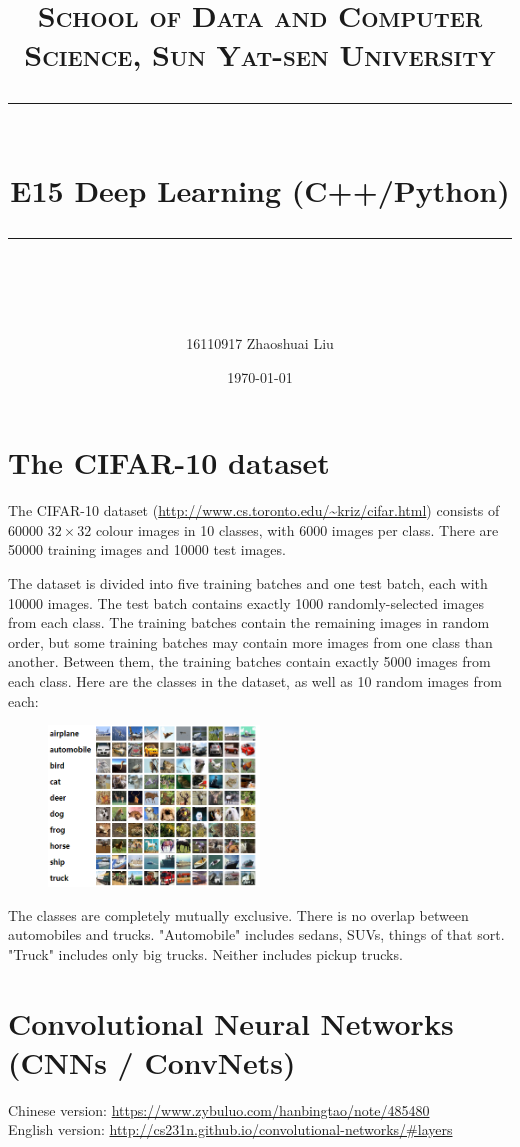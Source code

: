 ﻿\documentclass[a4paper, 11pt]{article}
\title{	
\normalfont \normalsize
\textsc{School of Data and Computer Science, Sun Yat-sen University} \\ [25pt] %
\rule{\textwidth}{0.5pt} \\[0.4cm] %
\huge  E15 Deep Learning (C++/Python)\\ %
\rule{\textwidth}{2pt} \\[0.5cm] %
\author{16110917 Zhaoshuai Liu}
\date{\normalsize\today}
}
\begin{document}
\maketitle
\tableofcontents
\newpage
\section{The CIFAR-10 dataset}
The CIFAR-10 dataset (\url{http://www.cs.toronto.edu/~kriz/cifar.html}) consists of 60000 $32\times 32$ colour images in 10 classes, with 6000 images per class. There are 50000 training images and 10000 test images. 

The dataset is divided into five training batches and one test batch, each with 10000 images. The test batch contains exactly 1000 randomly-selected images from each class. The training batches contain the remaining images in random order, but some training batches may contain more images from one class than another. Between them, the training batches contain exactly 5000 images from each class. Here are the classes in the dataset, as well as 10 random images from each:
\begin{figure}[ht]
\centering
\includegraphics[width=0.5\textwidth]{Pic/cifar}
\end{figure}

The classes are completely mutually exclusive. There is no overlap between automobiles and trucks. "Automobile" includes sedans, SUVs, things of that sort. "Truck" includes only big trucks. Neither includes pickup trucks.
\section{Convolutional Neural Networks (CNNs / ConvNets)}
Chinese version: \url{https://www.zybuluo.com/hanbingtao/note/485480}\\
English version: \url{http://cs231n.github.io/convolutional-networks/#layers}
\end{document}

